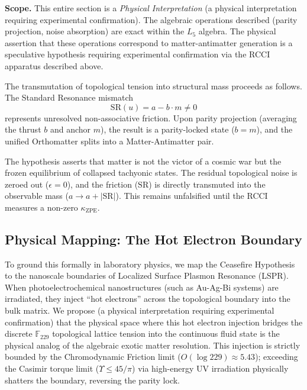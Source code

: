 \textbf{Scope.} This entire section is a \emph{Physical Interpretation} (a physical interpretation requiring experimental confirmation). The algebraic operations described (parity projection, noise absorption) are exact within the $L_5$ algebra. The physical assertion that these operations correspond to matter-antimatter generation is a speculative hypothesis requiring experimental confirmation via the RCCI apparatus described above.

\begin{hypothesis}\label{hyp:ceasefire}
The transmutation of topological tension into structural mass proceeds as follows. The Standard Resonance mismatch
\begin{equation}
    \mathrm{SR}(u) = a - b \cdot m \neq 0
\end{equation}
represents unresolved non-associative friction. Upon parity projection (averaging the thrust $b$ and anchor $m$), the result is a parity-locked state ($b=m$), and the unified Orthomatter splits into a Matter-Antimatter pair.

The hypothesis asserts that matter is not the victor of a cosmic war but the frozen equilibrium of collapsed tachyonic states. The residual topological noise is zeroed out ($\epsilon = 0$), and the friction ($\mathrm{SR}$) is directly transmuted into the observable mass ($a \to a + |\mathrm{SR}|$). This remains unfalsified until the RCCI measures a non-zero $\kappa_{\mathrm{ZPE}}$.
\end{hypothesis}

\subsection{Physical Mapping: The Hot Electron Boundary}
To ground this formally in laboratory physics, we map the Ceasefire Hypothesis to the nanoscale boundaries of Localized Surface Plasmon Resonance (LSPR). When photoelectrochemical nanostructures (such as Au-Ag-Bi systems) are irradiated, they inject ``hot electrons'' across the topological boundary into the bulk matrix. We propose (a physical interpretation requiring experimental confirmation) that the physical space where this hot electron injection bridges the discrete $\mathbb{F}_{229}$ topological lattice tension into the continuous fluid state is the physical analog of the algebraic exotic matter resolution. This injection is strictly bounded by the Chromodynamic Friction limit ($O(\log 229) \approx 5.43$); exceeding the Casimir torque limit ($\Upsilon \le 45/\pi$) via high-energy UV irradiation physically shatters the boundary, reversing the parity lock.

